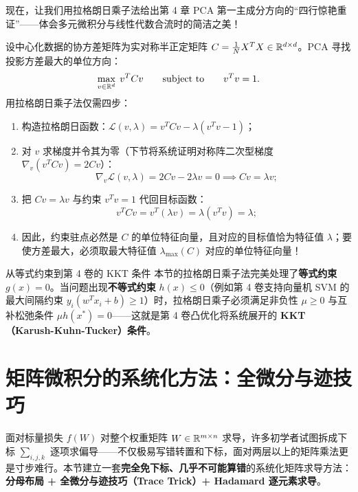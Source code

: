 现在，让我们用拉格朗日乘子法给出第 4 章 PCA 第一主成分方向的“四行惊艳重证”——体会多元微积分与线性代数合流时的简洁之美！

\begin{example}\label{ex:ch5-pca-lagrange}
设中心化数据的协方差矩阵为实对称半正定矩阵 $C = \frac{1}{N}X^T X \in \mathbb{R}^{d\times d}$。PCA 寻找投影方差最大的单位方向：
\[
  \max_{v\in\mathbb{R}^d}\; v^T C v \qquad \text{subject to}\qquad v^T v = 1.
\]
用拉格朗日乘子法仅需四步：
\begin{enumerate}
  \item 构造拉格朗日函数：$\mathcal{L}(v, \lambda) = v^T C v - \lambda(v^T v - 1)$；
  \item 对 $v$ 求梯度并令其为零（下节将系统证明对称阵二次型梯度 $\nabla_v(v^T C v) = 2Cv$）：
  \[
    \nabla_v \mathcal{L}(v, \lambda) = 2 C v - 2 \lambda v = 0 \implies C v = \lambda v;
  \]
  \item 把 $Cv = \lambda v$ 与约束 $v^T v = 1$ 代回目标函数：
  \[
    v^T C v = v^T (\lambda v) = \lambda (v^T v) = \lambda;
  \]
  \item 因此，约束驻点必然是 $C$ 的单位特征向量，且对应的目标值恰为特征值 $\lambda$；要使方差最大，必须取最大特征值 $\lambda_{\max}(C)$ 对应的单位特征向量！
\end{enumerate}
\end{example}

\begin{insightBox}{从等式约束到第 4 卷的 KKT 条件}
本节的拉格朗日乘子法完美处理了\textbf{等式约束} $g(x)=0$。当问题出现\textbf{不等式约束} $h(x)\le 0$（例如第 4 卷支持向量机 SVM 的最大间隔约束 $y_i(w^Tx_i+b)\ge 1$）时，拉格朗日乘子必须满足非负性 $\mu\ge 0$ 与互补松弛条件 $\mu h(x^*)=0$——这就是第 4 卷凸优化将系统展开的 \textbf{KKT（Karush-Kuhn-Tucker）条件}。
\end{insightBox}

\section{矩阵微积分的系统化方法：全微分与迹技巧}
\label{sec:ch5-matrix-calc}

面对标量损失 $f(W)$ 对整个权重矩阵 $W\in\mathbb{R}^{m\times n}$ 求导，许多初学者试图拆成下标 $\sum_{i,j,k}$ 逐项求偏导——不仅极易写错转置和下标，面对两层以上的矩阵乘法更是寸步难行。本节建立一套\textbf{完全免下标、几乎不可能算错}的系统化矩阵求导方法：\textbf{分母布局 + 全微分与迹技巧（Trace Trick）+ Hadamard 逐元素求导}。

